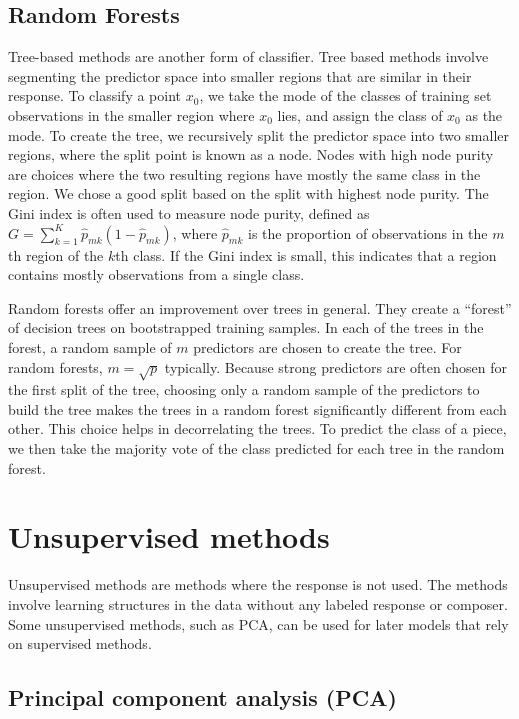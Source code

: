 \documentclass[12pt,twoside]{reedthesis}
\theoremstyle{definition}
\theoremstyle{definition}
\theoremstyle{definition}
\theoremstyle{remark}
\begin{document}
\subsection{Random Forests}\label{random-forests}

Tree-based methods are another form of classifier. Tree based methods
involve segmenting the predictor space into smaller regions that are
similar in their response. To classify a point \(x_0\), we take the mode
of the classes of training set observations in the smaller region where
\(x_0\) lies, and assign the class of \(x_0\) as the mode. To create the
tree, we recursively split the predictor space into two smaller regions,
where the split point is known as a node. Nodes with high node purity
are choices where the two resulting regions have mostly the same class
in the region. We chose a good split based on the split with highest
node purity. The Gini index is often used to measure node purity,
defined as \(G = \sum_{k = 1}^K \hat{p}_{mk}(1 - \hat{p}_{mk})\), where
\(\hat{p}_{mk}\) is the proportion of observations in the \(m\)th region
of the \(k\)th class. If the Gini index is small, this indicates that a
region contains mostly observations from a single class.

Random forests offer an improvement over trees in general. They create a
``forest'' of decision trees on bootstrapped training samples. In each
of the trees in the forest, a random sample of \(m\) predictors are
chosen to create the tree. For random forests, \(m = \sqrt{p}\)
typically. Because strong predictors are often chosen for the first
split of the tree, choosing only a random sample of the predictors to
build the tree makes the trees in a random forest significantly
different from each other. This choice helps in decorrelating the trees.
To predict the class of a piece, we then take the majority vote of the
class predicted for each tree in the random forest.

\section{Unsupervised methods}\label{unsupervised-methods}

Unsupervised methods are methods where the response is not used. The
methods involve learning structures in the data without any labeled
response or composer. Some unsupervised methods, such as PCA, can be
used for later models that rely on supervised methods.

\subsection{Principal component analysis
(PCA)}\label{principal-component-analysis-pca}
\end{document}
